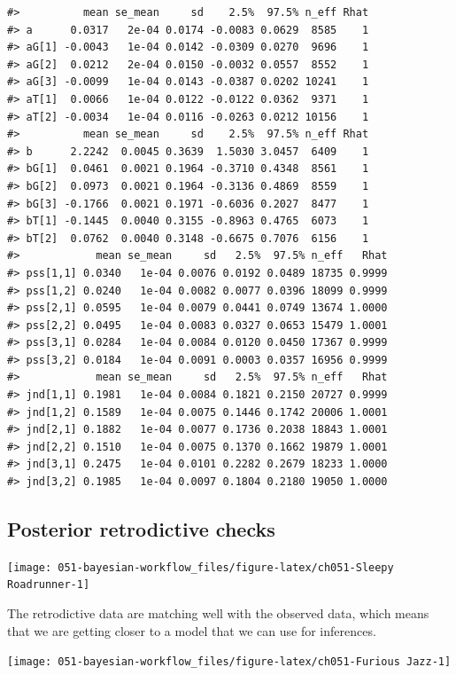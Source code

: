 \documentclass[11pt, oneside, openany]{scrbook}
\begin{document}
\begin{verbatim}
#>          mean se_mean     sd    2.5%  97.5% n_eff Rhat
#> a      0.0317   2e-04 0.0174 -0.0083 0.0629  8585    1
#> aG[1] -0.0043   1e-04 0.0142 -0.0309 0.0270  9696    1
#> aG[2]  0.0212   2e-04 0.0150 -0.0032 0.0557  8552    1
#> aG[3] -0.0099   1e-04 0.0143 -0.0387 0.0202 10241    1
#> aT[1]  0.0066   1e-04 0.0122 -0.0122 0.0362  9371    1
#> aT[2] -0.0034   1e-04 0.0116 -0.0263 0.0212 10156    1
#>          mean se_mean     sd    2.5%  97.5% n_eff Rhat
#> b      2.2242  0.0045 0.3639  1.5030 3.0457  6409    1
#> bG[1]  0.0461  0.0021 0.1964 -0.3710 0.4348  8561    1
#> bG[2]  0.0973  0.0021 0.1964 -0.3136 0.4869  8559    1
#> bG[3] -0.1766  0.0021 0.1971 -0.6036 0.2027  8477    1
#> bT[1] -0.1445  0.0040 0.3155 -0.8963 0.4765  6073    1
#> bT[2]  0.0762  0.0040 0.3148 -0.6675 0.7076  6156    1
#>            mean se_mean     sd   2.5%  97.5% n_eff   Rhat
#> pss[1,1] 0.0340   1e-04 0.0076 0.0192 0.0489 18735 0.9999
#> pss[1,2] 0.0240   1e-04 0.0082 0.0077 0.0396 18099 0.9999
#> pss[2,1] 0.0595   1e-04 0.0079 0.0441 0.0749 13674 1.0000
#> pss[2,2] 0.0495   1e-04 0.0083 0.0327 0.0653 15479 1.0001
#> pss[3,1] 0.0284   1e-04 0.0084 0.0120 0.0450 17367 0.9999
#> pss[3,2] 0.0184   1e-04 0.0091 0.0003 0.0357 16956 0.9999
#>            mean se_mean     sd   2.5%  97.5% n_eff   Rhat
#> jnd[1,1] 0.1981   1e-04 0.0084 0.1821 0.2150 20727 0.9999
#> jnd[1,2] 0.1589   1e-04 0.0075 0.1446 0.1742 20006 1.0001
#> jnd[2,1] 0.1882   1e-04 0.0077 0.1736 0.2038 18843 1.0001
#> jnd[2,2] 0.1510   1e-04 0.0075 0.1370 0.1662 19879 1.0001
#> jnd[3,1] 0.2475   1e-04 0.0101 0.2282 0.2679 18233 1.0000
#> jnd[3,2] 0.1985   1e-04 0.0097 0.1804 0.2180 19050 1.0000
\end{verbatim}

\hypertarget{posterior-retrodictive-checks}{%
\subsection{Posterior retrodictive checks}\label{posterior-retrodictive-checks}}

\begin{center}\texttt{[image: 051-bayesian-workflow\_files/figure-latex/ch051-Sleepy Roadrunner-1]} \end{center}

The retrodictive data are matching well with the observed data, which means that we are getting closer to a model that we can use for inferences.

\begin{center}\texttt{[image: 051-bayesian-workflow\_files/figure-latex/ch051-Furious Jazz-1]} \end{center}
\end{document}

